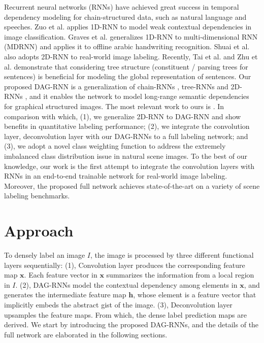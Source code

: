 \documentclass[10pt,twocolumn,letterpaper]{article}
\newcommand \hh {\mathbf{h}}
\newcommand \xx {\mathbf{x}}
\begin{document}
Recurrent neural networks (RNNs) have achieved great success in temporal dependency modeling for chain-structured data, such as natural language and speeches.
Zuo et al. \cite{zuo2015convolutional} applies 1D-RNN to model weak contextual dependencies in image classification.
Graves et al. \cite{graves2012offline} generalizes 1D-RNN to multi-dimensional RNN (MDRNN) and applies it to offline arabic handwriting recognition. Shuai et al.\cite{shuai2015quaddirectional} also adopts 2D-RNN to real-world image labeling. Recently, Tai et al.\cite{tai2015improved} and Zhu et al.\cite{zhu2015long} demonstrate that considering tree structure (constituent / parsing trees for sentences) is beneficial for modeling the global representation of sentences. Our proposed DAG-RNN is a generalization of chain-RNNs \cite{bengio2013advances}\cite{irsoy2014opinion}, tree-RNNs \cite{tai2015improved}\cite{zhu2015long} and 2D-RNNs \cite{graves2012offline}\cite{shuai2015quaddirectional}, and  it enables the network to model long-range semantic dependencies for graphical structured images. The most relevant work to ours is \cite{shuai2015quaddirectional}. In comparison with which, (1), we generalize 2D-RNN to DAG-RNN and show benefits in quantitative labeling performance; (2), we integrate the convolution layer, deconvolution layer with our DAG-RNNs to a full labeling network; and (3), we adopt a novel class weighting function to address the extremely imbalanced class distribution issue in natural scene images. To the best of our knowledge, our work is the first attempt to integrate the convolution layers with RNNs in an end-to-end trainable network for real-world image labeling.
Moreover, the proposed full network achieves state-of-the-art on a variety of scene labeling benchmarks.





\label{Section:related_work}
\section{Approach}
\label{Section:approach}


To densely label an image $I$, the image is processed by three different functional layers sequentially: (1), Convolution layer produces the corresponding feature map $\xx$. Each feature vector in $\xx$ summarizes the information from a local region in $I$. (2), DAG-RNNs model the contextual dependency among elements in $\xx$, and generates the intermediate feature map $\hh$, whose element is a feature vector that implicitly embeds the abstract gist of the image. (3), Deconvolution layer \cite{long2015fully} upsamples the feature maps. From which, the dense label prediction maps are derived. We start by introducing the proposed DAG-RNNs, and the details of the full network are elaborated in the following sections.
\end{document}
